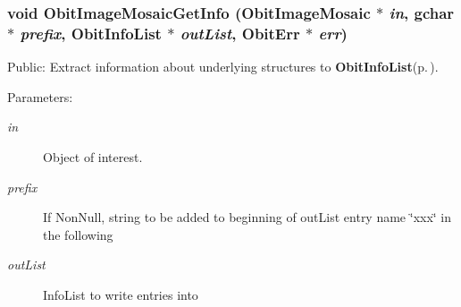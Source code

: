 \subsubsection{\setlength{\rightskip}{0pt plus 5cm}void Obit\-Image\-Mosaic\-Get\-Info ({\bf Obit\-Image\-Mosaic} $\ast$ {\em in}, gchar $\ast$ {\em prefix}, {\bf Obit\-Info\-List} $\ast$ {\em out\-List}, {\bf Obit\-Err} $\ast$ {\em err})}\label{ObitImageMosaic_8c_a31}


Public: Extract information about underlying structures to {\bf Obit\-Info\-List}{\rm (p.\,\pageref{structObitInfoList})}. 

\begin{Desc}
\item[Parameters:]
\begin{description}
\item[{\em in}]Object of interest. \item[{\em prefix}]If Non\-Null, string to be added to beginning of out\-List entry name \char`\"{}xxx\char`\"{} in the following \item[{\em out\-List}]Info\-List to write entries into \begin{itemize}

\end{itemize}
\end{description}
\end{Desc}
